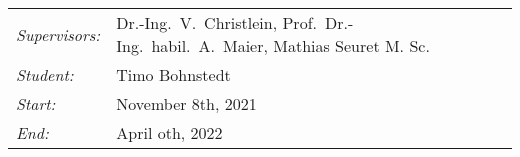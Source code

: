 \documentclass[12pt,a4paper]{article}
\begin{document}
		

		
\begin{tabular}{ll}
	\emph{Supervisors:} & Dr.-Ing.~V.~Christlein,  Prof.~Dr.-Ing.~habil.~A.~Maier, Mathias Seuret M. Sc.
	\\
	\emph{Student:}     & Timo Bohnstedt
	\\
	\emph{Start:}       & November 8th, 2021                                            \\
	\emph{End:}         & April oth, 2022                                        \\
\end{tabular}
\nopagebreak[4]
\small

		
\end{document}
